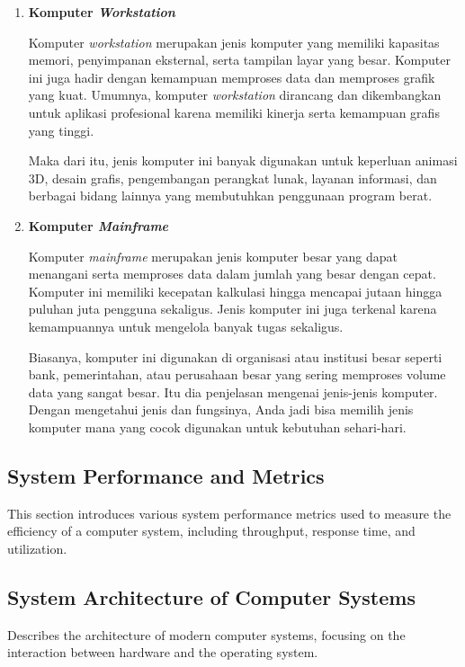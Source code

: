 \documentclass[12pt]{article}
\begin{document}
\begin{enumerate}
    \item \textbf{Komputer \textit{Workstation}}

    \hspace{0.61cm}Komputer \textit{workstation} merupakan jenis komputer yang memiliki kapasitas memori, penyimpanan eksternal, serta tampilan layar yang besar. Komputer ini juga hadir dengan kemampuan memproses data dan memproses grafik yang kuat. Umumnya, komputer \textit{workstation} dirancang dan dikembangkan untuk aplikasi profesional karena memiliki kinerja serta kemampuan grafis yang tinggi. 

    \hspace{0.61cm}Maka dari itu, jenis komputer ini banyak digunakan untuk keperluan animasi 3D, desain grafis, pengembangan perangkat lunak, layanan informasi, dan berbagai bidang lainnya yang membutuhkan penggunaan program berat. 

    \item \textbf{Komputer \textit{Mainframe}}

    \hspace{0.61cm}Komputer \textit{mainframe} merupakan jenis komputer besar yang dapat menangani serta memproses data dalam jumlah yang besar dengan cepat. Komputer ini memiliki kecepatan kalkulasi hingga mencapai jutaan hingga puluhan juta pengguna sekaligus. Jenis komputer ini juga terkenal karena kemampuannya untuk mengelola banyak tugas sekaligus. 

    \hspace{0.61cm}Biasanya, komputer ini digunakan di organisasi atau institusi besar seperti bank, pemerintahan, atau perusahaan besar yang sering memproses volume data yang sangat besar. Itu dia penjelasan mengenai jenis-jenis komputer. Dengan mengetahui jenis dan fungsinya, Anda jadi bisa memilih jenis komputer mana yang cocok digunakan untuk kebutuhan sehari-hari.
    
\end{enumerate}

\subsection{System Performance and Metrics}
This section introduces various system performance metrics used to measure the efficiency of a computer system, including throughput, response time, and utilization.

\subsection{System Architecture of Computer Systems}
Describes the architecture of modern computer systems, focusing on the interaction between hardware and the operating system.
\end{document}
